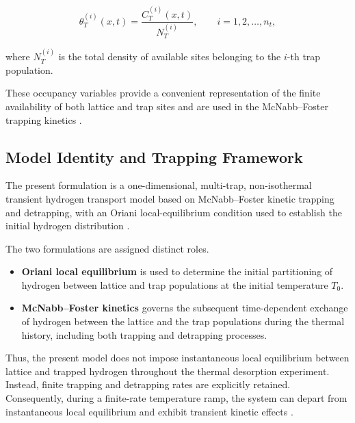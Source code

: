 \begin{equation}
\theta_T^{(i)}(x,t)
=
\frac{C_T^{(i)}(x,t)}{N_T^{(i)}},
\qquad
i=1,2,\ldots,n_t,
\label{eq:ch3_theta_T}
\end{equation}

where $N_T^{(i)}$ is the total density of available sites belonging to
the $i$-th trap population.

These occupancy variables provide a convenient representation of the
finite availability of both lattice and trap sites and are used in the
McNabb--Foster trapping kinetics
\cite{Krom2000,Legrand2015,Marrani2025}.

\subsection{Model Identity and Trapping Framework}
\label{subsec:model_identity}

The present formulation is a one-dimensional, multi-trap,
non-isothermal transient hydrogen transport model based on
McNabb--Foster kinetic trapping and detrapping, with an Oriani
local-equilibrium condition used to establish the initial hydrogen
distribution \cite{Oriani1970,McNabb1963,Turnbull1997,Krom2000,
Diaz2020,Marrani2025}.

The two formulations are assigned distinct roles.

\begin{itemize}

    \item \textbf{Oriani local equilibrium} is used to determine the
    initial partitioning of hydrogen between lattice and trap
    populations at the initial temperature $T_0$.

    \item \textbf{McNabb--Foster kinetics} governs the subsequent
    time-dependent exchange of hydrogen between the lattice and the
    trap populations during the thermal history, including both
    trapping and detrapping processes.

\end{itemize}

Thus, the present model does not impose instantaneous local
equilibrium between lattice and trapped hydrogen throughout the
thermal desorption experiment. Instead, finite trapping and detrapping
rates are explicitly retained. Consequently, during a finite-rate
temperature ramp, the system can depart from instantaneous local
equilibrium and exhibit transient kinetic effects
\cite{Turnbull1997,Legrand2015,Diaz2020,Marrani2025}.

